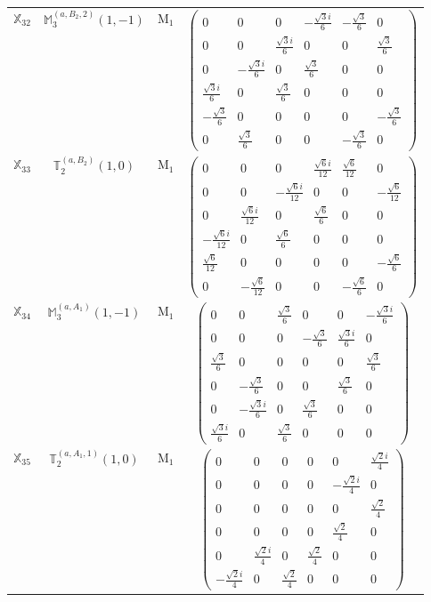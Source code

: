\documentclass[fleqn,10pt,landscape]{article}
\begin{document}
\begin{itemize}
\begin{center}
\begin{longtable}{c|c|c|c}
$ \mathbb{X}_{32} $ & $\mathbb{M}_{3}^{(a,B_{2},2)}(1,-1)$ & M$_{1}$ & $\begin{pmatrix} 0 & 0 & 0 & - \frac{\sqrt{3} i}{6} & - \frac{\sqrt{3}}{6} & 0 \\ 0 & 0 & \frac{\sqrt{3} i}{6} & 0 & 0 & \frac{\sqrt{3}}{6} \\ 0 & - \frac{\sqrt{3} i}{6} & 0 & \frac{\sqrt{3}}{6} & 0 & 0 \\ \frac{\sqrt{3} i}{6} & 0 & \frac{\sqrt{3}}{6} & 0 & 0 & 0 \\ - \frac{\sqrt{3}}{6} & 0 & 0 & 0 & 0 & - \frac{\sqrt{3}}{6} \\ 0 & \frac{\sqrt{3}}{6} & 0 & 0 & - \frac{\sqrt{3}}{6} & 0 \end{pmatrix}$ \\
$ \mathbb{X}_{33} $ & $\mathbb{T}_{2}^{(a,B_{2})}(1,0)$ & M$_{1}$ & $\begin{pmatrix} 0 & 0 & 0 & \frac{\sqrt{6} i}{12} & \frac{\sqrt{6}}{12} & 0 \\ 0 & 0 & - \frac{\sqrt{6} i}{12} & 0 & 0 & - \frac{\sqrt{6}}{12} \\ 0 & \frac{\sqrt{6} i}{12} & 0 & \frac{\sqrt{6}}{6} & 0 & 0 \\ - \frac{\sqrt{6} i}{12} & 0 & \frac{\sqrt{6}}{6} & 0 & 0 & 0 \\ \frac{\sqrt{6}}{12} & 0 & 0 & 0 & 0 & - \frac{\sqrt{6}}{6} \\ 0 & - \frac{\sqrt{6}}{12} & 0 & 0 & - \frac{\sqrt{6}}{6} & 0 \end{pmatrix}$ \\
$ \mathbb{X}_{34} $ & $\mathbb{M}_{3}^{(a,A_{1})}(1,-1)$ & M$_{1}$ & $\begin{pmatrix} 0 & 0 & \frac{\sqrt{3}}{6} & 0 & 0 & - \frac{\sqrt{3} i}{6} \\ 0 & 0 & 0 & - \frac{\sqrt{3}}{6} & \frac{\sqrt{3} i}{6} & 0 \\ \frac{\sqrt{3}}{6} & 0 & 0 & 0 & 0 & \frac{\sqrt{3}}{6} \\ 0 & - \frac{\sqrt{3}}{6} & 0 & 0 & \frac{\sqrt{3}}{6} & 0 \\ 0 & - \frac{\sqrt{3} i}{6} & 0 & \frac{\sqrt{3}}{6} & 0 & 0 \\ \frac{\sqrt{3} i}{6} & 0 & \frac{\sqrt{3}}{6} & 0 & 0 & 0 \end{pmatrix}$ \\
$ \mathbb{X}_{35} $ & $\mathbb{T}_{2}^{(a,A_{1},1)}(1,0)$ & M$_{1}$ & $\begin{pmatrix} 0 & 0 & 0 & 0 & 0 & \frac{\sqrt{2} i}{4} \\ 0 & 0 & 0 & 0 & - \frac{\sqrt{2} i}{4} & 0 \\ 0 & 0 & 0 & 0 & 0 & \frac{\sqrt{2}}{4} \\ 0 & 0 & 0 & 0 & \frac{\sqrt{2}}{4} & 0 \\ 0 & \frac{\sqrt{2} i}{4} & 0 & \frac{\sqrt{2}}{4} & 0 & 0 \\ - \frac{\sqrt{2} i}{4} & 0 & \frac{\sqrt{2}}{4} & 0 & 0 & 0 \end{pmatrix}$ \\

\end{longtable}
\end{center}
\end{itemize}
\end{document}
